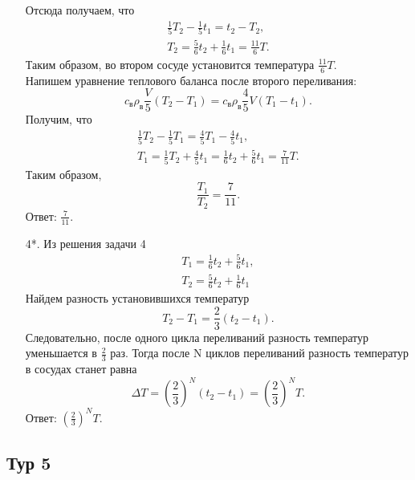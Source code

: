 \documentclass[12pt]{article} %
\begin{document}
\begin{enumerate}
        Отсюда получаем, что
        \begin{align}
            \frac{1}{5}T_2-\frac{1}{5}t_1 = t_2 - T_2,\\
            T_2 = \frac{5}{6}t_2 + \frac{1}{6}t_1 = \frac{11}{6}T.
        \end{align}
        Таким образом, во втором сосуде установится температура $\frac{11}{6}T$.\\
        Напишем уравнение теплового баланса после второго переливания:
        \[
            c_{\text{в}}\rho_{\text{в}}\frac{V}{5}(T_2 - T_1) = c_{\text{в}}\rho_{\text{в}}\frac{4}{5}V(T_1-t_1).
        \]
        Получим, что
        \begin{align}
            \frac{1}{5}T_2 - \frac{1}{5}T_1 = \frac{4}{5}T_1 - \frac{4}{5}t_1,\\
            T_1 = \frac{1}{5}T_2 + \frac{4}{5}t_1 = \frac{1}{6}t_2 + \frac{5}{6}t_1 = \frac{7}{11}T.
        \end{align}
        Таким образом, 
         \[
            \frac{T_{1}}{T_{2}} = \frac{7}{11}. 
        \]
        Ответ: $\frac{7}{11}$.
        
    \item[4*.] 
        Из решения задачи 4
        \begin{align}
            T_1 = \frac{1}{6}t_2 + \frac{5}{6}t_1, \\
            T_2 = \frac{5}{6}t_2 + \frac{1}{6}t_1
        \end{align}
        Найдем разность установившихся температур
        \[
            T_2 - T_1 = \frac{2}{3}(t_2-t_1).
        \]
        Следовательно, после одного цикла переливаний разность температур уменьшается в $\frac{2}{3}$ раз. Тогда после N циклов переливаний разность температур в сосудах станет равна
        \[
            \Delta T=\left(\frac{2}{3}\right)^N(t_2-t_1) = \left(\frac{2}{3}\right)^N T.
        \]
        Ответ: $\left(\frac{2}{3}\right)^N T$.
        
    \end{enumerate}
    
    
\subsection*{Тур 5}
\end{document}
